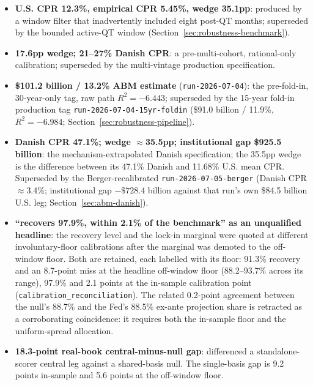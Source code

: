 \documentclass[12pt]{article}
\begin{document}
\begingroup\sloppy
\begin{itemize}
\item \textbf{U.S. CPR 12.3\%, empirical CPR 5.45\%, wedge 35.1pp}: produced by a window filter that inadvertently included eight post-QT months; superseded by the bounded active-QT window (Section~\ref{sec:robustness-benchmark}).
\item \textbf{17.6pp wedge; 21--27\% Danish CPR}: a pre-multi-cohort, rational-only calibration; superseded by the multi-vintage production specification.
\item \textbf{\$101.2 billion / 13.2\% ABM estimate} (\texttt{run-2026-07-04}): the pre-fold-in, 30-year-only tag, raw path $R^2 = -6.443$; superseded by the 15-year fold-in production tag \texttt{run-2026-07-04-15yr-foldin} (\$91.0 billion / 11.9\%, $R^2 = -6.984$; Section~\ref{sec:robustness-pipeline}).
\item \textbf{Danish CPR 47.1\%; wedge $\approx$35.5pp; institutional gap \$925.5 billion}: the mechanism-extrapolated Danish specification; the 35.5pp wedge is the difference between its 47.1\% Danish and 11.68\% U.S. mean CPR. Superseded by the Berger-recalibrated \texttt{run-2026-07-05-berger} (Danish CPR $\approx$3.4\%; institutional gap $-\$728.4$ billion against that run's own \$84.5 billion U.S. leg; Section~\ref{sec:abm-danish}).
\item \textbf{``recovers 97.9\%, within 2.1\% of the benchmark'' as an unqualified headline}: the recovery level and the lock-in marginal were quoted at different involuntary-floor calibrations after the marginal was demoted to the off-window floor. Both are retained, each labelled with its floor: 91.3\% recovery and an 8.7-point miss at the headline off-window floor (88.2--93.7\% across its range), 97.9\% and 2.1 points at the in-sample calibration point (\texttt{calibration\_reconciliation}). The related 0.2-point agreement between the null's 88.7\% and the Fed's 88.5\% ex-ante projection share is retracted as a corroborating coincidence: it requires both the in-sample floor and the uniform-spread allocation.

\item \textbf{18.3-point real-book central-minus-null gap}: differenced a standalone-scorer central leg against a shared-basis null. The single-basis gap is 9.2 points in-sample and 5.6 points at the off-window floor.


\end{itemize}
\end{document}
